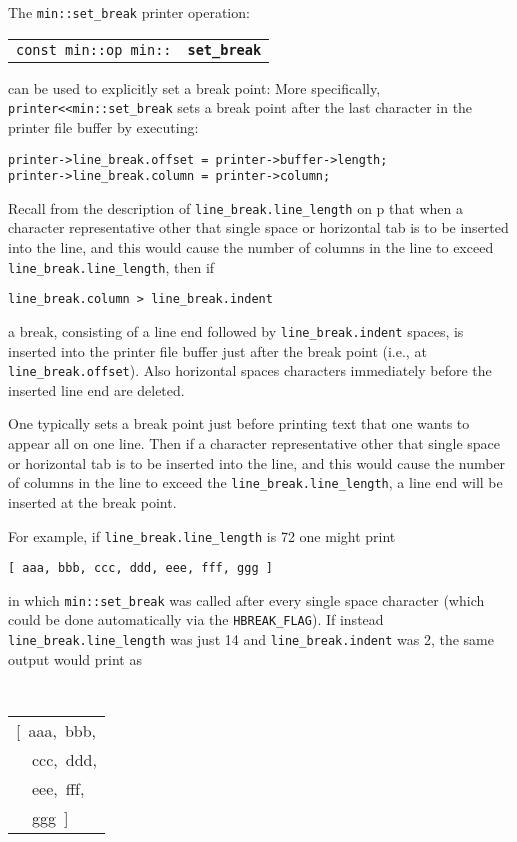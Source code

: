 \documentclass[12pt]{article}
\makeatletter
\newcommand{\ttindex}[1]{\index{#1@{\tt #1}}}
\newcommand{\minindex}[1]{\ttindex{min::#1}\ttindex{#1}}
\newcommand{\pagref}[1]{p\pageref{#1}}
\newcommand{\EOL}{\penalty \exhyphenpenalty}
\newenvironment{indpar}[1][0.3in]%
	{\begin{list}{}%
		     {\setlength{\itemsep}{0in}%
		      \setlength{\topsep}{0in}%
		      \setlength{\parsep}{1ex}%
		      \setlength{\labelwidth}{#1}%
		      \setlength{\leftmargin}{#1}%
		      \addtolength{\leftmargin}{\labelsep}}%
	 \item}%
	{\end{list}}
\newcommand{\LABEL}[1]{\label{#1}}
\newcommand{\MINKEY}[1]{{\tt \bf #1}\minindex{#1}}
\makeatother
\begin{document}
The {\tt min::set\_\EOL break} printer operation:

\begin{indpar}[1em]\begin{tabular}{r@{}l}
\verb|const min::op min::| & \MINKEY{set\_\EOL break}
\LABEL{MIN::SET_BREAK} \\
\end{tabular}\end{indpar}

can be used to explicitly set a break point:
More specifically, {\tt printer<{}<min::set\_\EOL break} sets a break point after
the last character in the printer file buffer by executing:
\begin{indpar}\begin{verbatim}
printer->line_break.offset = printer->buffer->length;
printer->line_break.column = printer->column;
\end{verbatim}\end{indpar}

Recall from the description of {\tt line\_\EOL break.line\_\EOL length} on
\pagref{LINE-LENGTH}
that when a character representative other that single space or horizontal
tab is to be inserted into the line, and this would cause the number
of columns in the line to exceed {\tt line\_\EOL break.line\_\EOL length},
then if
\begin{center}
\tt line\_break.column > line\_break.indent
\end{center}
a break, consisting of a line end followed by {\tt line\_\EOL break.indent}
spaces,
is inserted into the printer file buffer just after the break point
(i.e., at {\tt line\_\EOL break.offset}).  Also
horizontal spaces
characters immediately before the inserted line end are deleted.

One typically sets a break point just before printing text that one wants
to appear all on one line.  Then if
a character representative other that single space or horizontal
tab is to be inserted into the line, and this would cause the number
of columns in the line to exceed the {\tt line\_\EOL break.line\_\EOL length},
a line end will be inserted at the break point.

For example, if {\tt line\_\EOL break.line\_\EOL length} is 72 one might
print
\begin{center}
\tt [ aaa, bbb, ccc, ddd, eee, fff, ggg ]
\end{center}
in which {\tt min::\EOL set\_\EOL break} was called after every single space
character (which could be done automatically via the {\tt HBREAK\_\EOL FLAG}).
If instead {\tt line\_\EOL break.line\_\EOL length}
was just 14 and {\tt line\_\EOL break.indent} was 2,
the same output would
print as
\begin{center}
\tt
\begin{tabular}{l}
[~aaa,~bbb, \\
~~ccc,~ddd, \\
~~eee,~fff, \\
~~ggg~] \\
\end{tabular}
\end{center}
\end{document}
